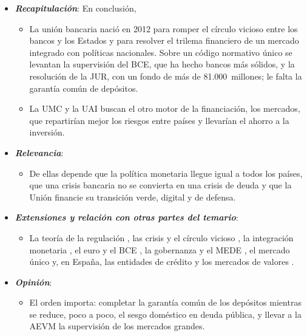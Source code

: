 \documentclass[11pt]{article}
\begin{document}
\begin{itemize}
\item \textbf{\emph{Recapitulación}}: En conclusión,
  \begin{itemize}
  \item La unión bancaria nació en 2012 para romper el círculo vicioso entre los bancos y los Estados y para resolver el trilema financiero de un mercado integrado con políticas nacionales. Sobre un código normativo único se levantan la supervisión del BCE, que ha hecho bancos más sólidos, y la resolución de la JUR, con un fondo de más de 81.000~millones; le falta la garantía común de depósitos.
  \item La UMC y la UAI buscan el otro motor de la financiación, los mercados, que repartirían mejor los riesgos entre países y llevarían el ahorro a la inversión.
  \end{itemize}
\item \textbf{\emph{Relevancia}}:
  \begin{itemize}
  \item De ellas depende que la política monetaria llegue igual a todos los países, que una crisis bancaria no se convierta en una crisis de deuda y que la Unión financie su transición verde, digital y de defensa.
  \end{itemize}
\item \textbf{\emph{Extensiones y relación con otras partes del temario}}:
  \begin{itemize}
  \item La teoría de la regulación , las crisis y el círculo vicioso , la integración monetaria , el euro y el BCE , la gobernanza y el MEDE , el mercado único  y, en España, las entidades de crédito y los mercados de valores  .
  \end{itemize}
\item \textbf{\emph{Opinión}}:
  \begin{itemize}
  \item El orden importa: completar la garantía común de los depósitos mientras se reduce, poco a poco, el sesgo doméstico en deuda pública, y llevar a la AEVM la supervisión de los mercados grandes.


\end{itemize}
\end{itemize}
\end{document}
